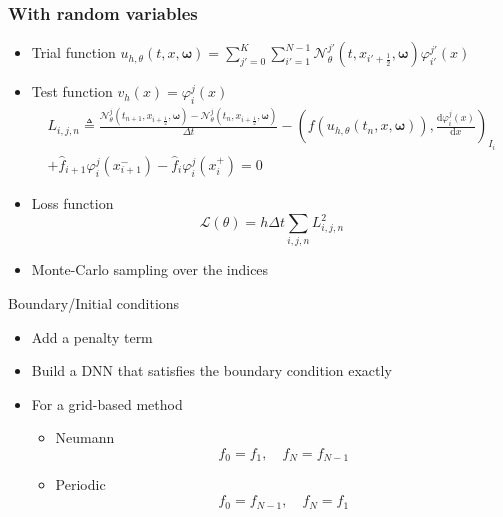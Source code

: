 \documentclass[aspectratio=169]{beamer}
\begin{document}
\begin{frame}
\frametitle{With random variables}

\begin{itemize}
	\item Trial function $u_{h,\theta}(t,x,\boldsymbol{\omega}) = \sum_{j'=0}^K \sum_{i'=1}^{N-1}  \mathcal{N}_\theta^{j'} (t,x_{i'+\frac{1}{2}},\boldsymbol{\omega})\varphi^{j'}_{i'}(x)$
	\item Test function $v_h(x)=\varphi^{j}_{i}(x)$
	\begin{multline*}
	L_{i,j,n}\triangleq\frac{\mathcal{N}^j_\theta(t_{n+1},x_{i+\frac{1}{2}},\boldsymbol{\omega})-\mathcal{N}^j_\theta(t_{n},x_{i+\frac{1}{2}},\boldsymbol{\omega})}{\Delta t} - \left(f(u_{h,\theta}(t_n,x,\boldsymbol{\omega})),\frac{\mathrm{d} \varphi^j_i(x)}{\mathrm{d} x}\right)_{I_i} \\
	+  \hat{f}_{i+1}\varphi^j_i(x_{i+1}^-) - \hat{f}_{i} \varphi^j_i(x_{i}^+) = 0
	\end{multline*}
	\item Loss function
	\begin{equation*}
	\mathcal{L}(\theta) = h\Delta t\sum_{i,j,n} L^2_{i,j,n}
	\end{equation*}
	\item Monte-Carlo sampling over the indices
\end{itemize}
\end{frame}

\begin{frame}{Boundary/Initial conditions}

\begin{itemize}
	\item Add a penalty term 
	\item Build a DNN that satisfies the boundary condition exactly 
	\item For a grid-based method
	\begin{itemize}
		\item Neumann
		\begin{equation*}
		f_{0} = f_{1}, \quad f_{N} = f_{N-1}
		\end{equation*}
		\item Periodic
		\begin{equation*}
		f_{0} = f_{N-1}, \quad f_{N} = f_{1}
		\end{equation*}
	\end{itemize}
\end{itemize}

\end{frame}
\end{document}
